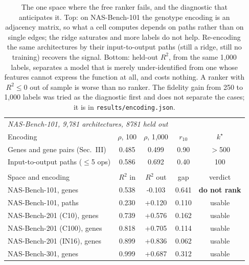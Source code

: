 \begin{table}[t]
\centering
\caption{The one space where the free ranker fails, and the diagnostic that anticipates it. Top: on NAS-Bench-101 the genotype encoding is an adjacency matrix, so what a cell computes depends on paths rather than on single edges; the ridge saturates and more labels do not help. Re-encoding the same architectures by their input-to-output paths (still a ridge, still no training) recovers the signal. Bottom: held-out $R^{2}$, from the same 1{,}000 labels, separates a model that is merely under-identified from one whose features cannot express the function at all, and costs nothing. A ranker with $R^{2} \le 0$ out of sample is worse than no ranker. The fidelity gain from 250 to 1{,}000 labels was tried as the diagnostic first and does not separate the cases; it is in \texttt{results/encoding.json}.}
\label{tab:encoding}
\footnotesize
\setlength{\tabcolsep}{4pt}
\begin{tabular}{lcccc}
\toprule
\multicolumn{5}{l}{\emph{NAS-Bench-101, 9{,}781 architectures, 8781 held out}} \\
Encoding & $\rho$, 100 & $\rho$, 1{,}000 & $r_{10}$ & $k^{\star}$ \\
\midrule
\quad Genes and gene pairs (Sec.~III) & 0.485 & 0.499 & 0.90 & $>$500 \\
\quad Input-to-output paths ($\leq$5 ops) & 0.586 & 0.692 & 0.40 & 100 \\
\addlinespace[2pt]\midrule
\multicolumn{5}{l}{\emph{The diagnostic, from the same 1{,}000 labels and no more}} \\
Space and encoding & $R^{2}$ in & $R^{2}$ out & gap & verdict \\
\midrule
\quad NAS-Bench-101, genes & 0.538 & -0.103 & 0.641 & \textbf{do not rank} \\
\quad NAS-Bench-101, paths & 0.230 & +0.120 & 0.110 & usable \\
\quad NAS-Bench-201 (C10), genes & 0.739 & +0.576 & 0.162 & usable \\
\quad NAS-Bench-201 (C100), genes & 0.818 & +0.705 & 0.114 & usable \\
\quad NAS-Bench-201 (IN16), genes & 0.899 & +0.836 & 0.062 & usable \\
\quad NAS-Bench-301, genes & 0.999 & +0.687 & 0.312 & usable \\
\bottomrule
\end{tabular}
\end{table}
